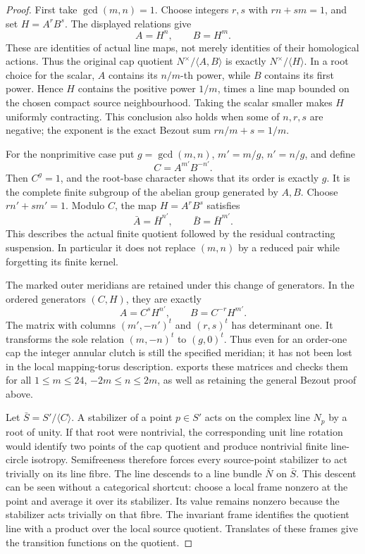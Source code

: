 \begin{proof}
First take \(\gcd(m,n)=1\).  Choose integers \(r,s\)
with \(rn+sm=1\), and set \(H=A^rB^s\).  The displayed
relations give
\[
                  A=H^n,\qquad B=H^m.
\]
These are identities of actual line maps, not merely identities
of their homological actions.  Thus the original cap quotient
\(N^\times/\langle A,B\rangle\) is exactly
\(N^\times/\langle H\rangle\).  In a root choice for the
scalar, \(A\) contains its \(n/m\)-th power, while \(B\)
contains its first power.  Hence \(H\) contains the positive
power \(1/m\), times a line map bounded on the chosen compact
source neighbourhood.  Taking the scalar smaller makes \(H\)
uniformly contracting.  This conclusion also holds when some of
\(n,r,s\) are negative; the exponent is the exact Bezout
sum \(rn/m+s=1/m\).

For the nonprimitive case put \(g=\gcd(m,n)\),
\(m'=m/g\), \(n'=n/g\), and define
\[
                  C=A^{m'}B^{-n'}.
\]
Then \(C^g=1\), and the root-base character shows that its
order is exactly \(g\).  It is the complete finite subgroup
of the abelian group generated by \(A,B\).  Choose
\(rn'+sm'=1\).  Modulo \(C\), the map
\(H=A^rB^s\) satisfies
\[
             \bar A=\bar H^{n'},\qquad
             \bar B=\bar H^{m'}.
\]
This describes the actual finite quotient followed by the
residual contracting suspension.  In particular it does not
replace \((m,n)\) by a reduced pair while forgetting its
finite kernel.

The marked outer meridians are retained under this change of
generators.  In the ordered generators \((C,H)\), they are
exactly
\[
                   A=C^sH^{n'},\qquad
                   B=C^{-r}H^{m'}.
\]
The matrix with columns \((m',-n')^t\) and \((r,s)^t\)
has determinant one.  It transforms the sole relation
\((m,-n)^t\) to \((g,0)^t\).  Thus even for an order-one
cap the integer annular clutch is still the specified meridian;
it has not been lost in the local mapping-torus description.
 exports these matrices
and checks them for all \(1\le m\le24\),
\(-2m\le n\le2m\), as well as retaining the general
Bezout proof above.

Let \(\bar S=S'/\langle C\rangle\).  A stabilizer of a
point \(p\in S'\) acts on the complex line \(N_p\) by
a root of unity.  If that root were nontrivial, the corresponding
unit line rotation would identify two points of the cap quotient
and produce nontrivial finite line-circle isotropy.  Semifreeness
therefore forces every source-point stabilizer to act trivially
on its line fibre.  The line descends to a line bundle
\(\bar N\) on \(\bar S\).  This descent can be seen
without a categorical shortcut: choose a local frame nonzero at
the point and average it over its stabilizer.  Its value remains
nonzero because the stabilizer acts trivially on that fibre.
The invariant frame identifies the quotient line with a product
over the local source quotient.  Translates of these frames give
the transition functions on the quotient.


\end{proof}
